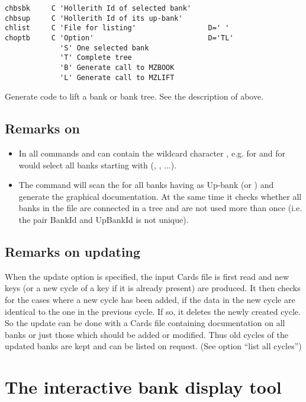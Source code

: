 \begin{verbatim}
chbsbk     C 'Hollerith Id of selected bank'
chbsup     C 'Hollerith Id of its up-bank'
chlist     C 'File for listing'                 D=' '
choptb     C 'Option'                           D='TL'
             'S' One selected bank
             'T' Complete tree
             'B' Generate call to MZBOOK
             'L' Generate call to MZLIFT
\end{verbatim}
 
Generate code to lift a bank or bank tree.
See the description of  above.
 
\subsection*{Remarks on }
 
\begin{itemize}
\item In all  commands  and  can contain 
      the wildcard character \Lit{*}, e.g.  for  
      and  for  would select all banks starting
      with  (, , ...). 
\item The command  will scan the \RZfile{}
      for all banks having as Up-bank  (or ) 
      and generate the graphical documentation. 
      At the same time it checks whether all banks in the file are connected 
      in a tree and are not used more than once
      (i.e. the pair BankId  and UpBankId is not unique).
\end{itemize}
 
\subsection*{Remarks on updating}
 
When the update option is specified, the input Cards file is
first read and new keys (or a new cycle of a key if it is already present)
are produced. 
It then checks for the cases where a new cycle has been added, if the data
in the new cycle are identical to the one in the previous cycle.
If so, it deletes the newly created cycle. 
So the update can be done
with a Cards file containing documentation on all banks or just
those which should be added or modified. 
Thus old cycles of the updated banks are kept and can be listed on request.
(See option ``list all cycles'')
 
\section{The interactive bank display tool}
\label{sec:dzdocdzdisp} 
 
